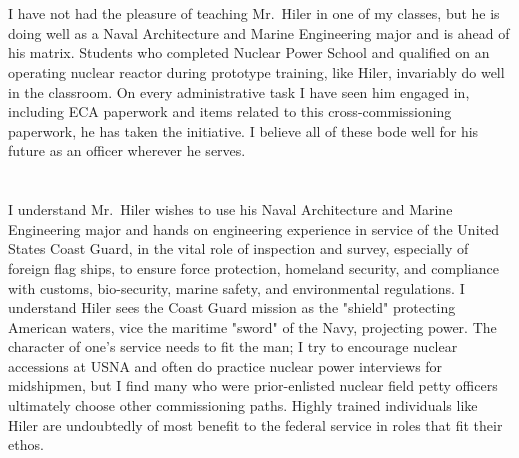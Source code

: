 \documentclass[10pt,courier]{navymemo}
\begin{document}
\section{}
I have not had the pleasure of teaching Mr.~Hiler in one of my classes, but he is doing well as a Naval Architecture and Marine Engineering major and is ahead of his matrix. Students who completed Nuclear Power School and qualified on an operating nuclear reactor during prototype training, like Hiler, invariably do well in the classroom. On every administrative task I have seen him engaged in, including ECA paperwork and items related to this cross-commissioning paperwork, he has taken the initiative. I believe all of these bode well for his future as an officer wherever he serves.

\section{}
I understand Mr.~Hiler wishes to use his Naval Architecture and Marine Engineering major and hands on engineering experience in service of the United States Coast Guard, in the vital role of inspection and survey, especially of foreign flag ships, to ensure force protection, homeland security, and compliance with customs, bio-security, marine safety, and environmental regulations. I understand Hiler sees the Coast Guard mission as the "shield" protecting American waters, vice the maritime "sword" of the Navy, projecting power. The character of one's service needs to fit the man; I try to encourage nuclear accessions at USNA and often do practice nuclear power interviews for midshipmen, but I find many who were prior-enlisted nuclear field petty officers ultimately choose other commissioning paths. Highly trained individuals like Hiler are undoubtedly of most benefit to the federal service in roles that fit their ethos.
\noclosing{}
\signature{}
\signature{D EVANGELISTA}
\end{document}
